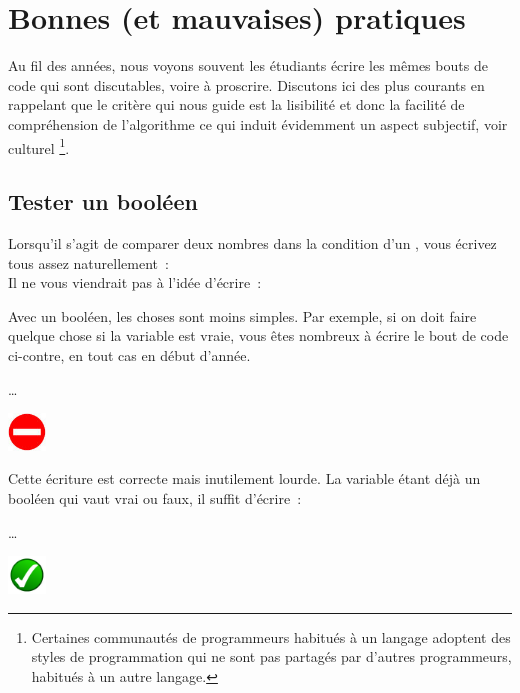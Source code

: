 \chapter{Bonnes (et mauvaises) pratiques}

	Au fil des années,
	nous voyons souvent les étudiants écrire
	les mêmes bouts de code qui sont discutables,
	voire à proscrire.
	Discutons ici des plus courants en rappelant
	que le critère qui nous guide est la lisibilité
	et donc la facilité de compréhension de l'algorithme
	ce qui induit évidemment un aspect subjectif, voir culturel%
	\footnote{%
		Certaines communautés de programmeurs habitués à un langage
		adoptent des styles de programmation qui ne sont pas
		partagés par d'autres programmeurs, habitués à un autre langage.
	}.
	
\section{Tester un booléen}

	Lorsqu’il s’agit de comparer deux nombres dans la condition
	d’un , vous écrivez tous assez naturellement~:
	\\Il ne vous viendrait pas à l’idée d’écrire~:
	
	\bigskip
	\begin{minipage}{9cm}
		Avec un booléen, les choses sont moins simples.
		Par exemple, si on doit faire quelque chose
		si la variable  est vraie,
		vous êtes nombreux à écrire
		le bout de code ci-contre,
		en tout cas en début d’année.
	\end{minipage}
	\quad
	\begin{minipage}{4cm}
		\begin{LDA}
			\Stmt \dots
		\EndIf
		\end{LDA}
	\end{minipage}
	\hskip-5mm
	\includegraphics[width=1cm]{icon/dont}
	
	\bigskip
	\begin{minipage}{9cm}
		Cette écriture est correcte mais inutilement lourde.
		La variable étant déjà un booléen qui vaut vrai ou faux,
		il suffit d’écrire~:
	\end{minipage}
	\quad
	\begin{minipage}{4cm}
		\begin{LDA}
		\If{adulte}
			\Stmt \dots
		\EndIf
		\end{LDA}
	\end{minipage}
	\hskip-5mm
	\includegraphics[width=1cm]{icon/do}
	
